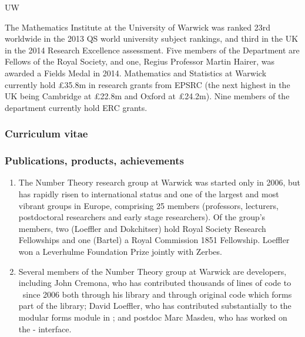 \begin{sitedescription}{UW}

The Mathematics Institute at the University of Warwick was ranked 23rd
worldwide in the 2013 QS world university subject rankings, and third in
the UK in the 2014 Research Excellence assessment.  Five
members of the Department are Fellows of the Royal Society, and one,
Regius Professor Martin Hairer, was awarded a Fields Medal in 2014.
Mathematics and Statistics at Warwick currently hold \pounds 35.8m in
research grants from EPSRC (the next highest in the UK being Cambridge
at \pounds 22.8m and Oxford at \pounds 24.2m).  Nine members of the department
currently hold ERC grants.



\subsubsection*{Curriculum vitae}




%
%

\subsubsection*{Publications, products, achievements}
\begin{enumerate}
\item
The Number Theory research group at Warwick was started only in 2006,
but has rapidly risen to international status and one of the largest
and most vibrant groups in Europe, comprising 25 members (professors,
lecturers, postdoctoral researchers and early stage researchers).  Of
the group's members, two (Loeffler and Dokchitser) hold Royal Society
Research Fellowships and one (Bartel) a Royal Commission 1851
Fellowship.  Loeffler won a Leverhulme Foundation Prize jointly with
Zerbes.
\item
Several members of the Number Theory group at Warwick are \Sage
developers, including John Cremona, who has contributed thousands of
lines of code to \Sage\ since 2006 both through his  
library and through original \Python code which forms part of the
\Sage library; David Loeffler, who has contributed substantially to
the modular forms module in \Sage; and postdoc Marc Masdeu, who has
worked on the \Sage- interface.
\end{enumerate}


\end{sitedescription}
